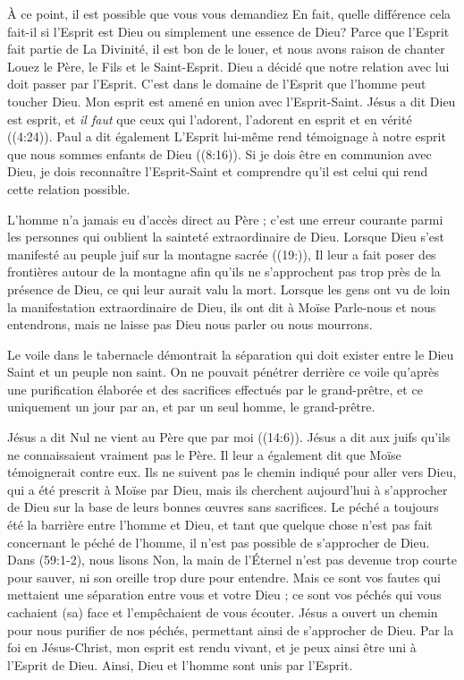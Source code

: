 À ce point, il est possible que vous vous demandiez\frcolon{}
 \Og En fait, quelle différence cela fait-il si l'Esprit est Dieu
 ou simplement une essence de Dieu? \Fg{}
 Parce que l'Esprit fait partie de La Divinité, il est bon de le louer,
 et nous avons raison de chanter\frcolon{}
 \Og Louez le Père, le Fils et le Saint-Esprit. \Fg{}
 Dieu a décidé que notre relation avec lui doit passer par
 l'Esprit. C'est dans le domaine de l'Esprit que l'homme peut toucher Dieu.
 Mon esprit est amené en union avec l'Esprit-Saint. Jésus a dit\frcolon{}
 \Og Dieu est esprit, et \emph{il faut} que ceux qui l'adorent, l'adorent en esprit
 et en vérité \Fg{} ((4:24)).
 Paul a dit également\frcolon{} \Og L'Esprit lui-même rend témoignage à notre esprit
 que nous sommes enfants de Dieu \Fg{} ((8:16)).
 Si je dois être en communion avec Dieu, je dois reconnaître l'Esprit-Saint
 et comprendre qu'il est celui qui rend cette relation possible.

L'homme n'a jamais eu d'accès direct au Père ; c'est une erreur courante parmi
 les personnes qui oublient la sainteté extraordinaire de Dieu.
 Lorsque Dieu s'est manifesté au peuple juif sur la montagne sacrée
 ((19:)), Il leur a fait poser des frontières autour de
 la montagne afin qu'ils ne s'approchent pas trop près de la présence
 de Dieu, ce qui leur aurait valu la mort.
 Lorsque les gens ont vu de loin la manifestation extraordinaire de Dieu,
 ils ont dit à Moïse\frcolon{}
 \Og Parle-nous et nous entendrons, mais ne laisse pas Dieu nous parler
 ou nous mourrons. \Fg{}

Le voile dans le tabernacle démontrait la séparation qui doit exister entre
 le Dieu Saint et un peuple non saint.
 On ne pouvait pénétrer derrière ce voile qu'après une purification élaborée
 et des sacrifices effectués par le grand-prêtre, et ce uniquement un jour par an,
 et par un seul homme, le grand-prêtre.

Jésus a dit\frcolon{} \Og Nul ne vient au Père que par moi \Fg{}
 ((14:6)).
 Jésus a dit aux juifs qu'ils ne connaissaient vraiment pas le Père.
 Il leur a également dit que Moïse témoignerait contre eux.
 Ils ne suivent pas le chemin indiqué pour aller vers Dieu, qui a été prescrit
 à Moïse par Dieu, mais ils cherchent aujourd'hui à s'approcher de Dieu
 sur la base de leurs bonnes œuvres sans sacrifices.
 Le péché a toujours été la barrière entre l'homme et Dieu, et tant
 que quelque chose n'est pas fait concernant le péché de l'homme,
 il n'est pas possible de s'approcher de Dieu.
 Dans (59:1-2), nous lisons\frcolon{}
 \Og Non, la main de l'Éternel n'est pas devenue trop courte pour sauver,
 ni son oreille trop dure pour entendre.
 Mais ce sont vos fautes qui mettaient une séparation entre vous et votre Dieu ;
 ce sont vos péchés qui vous cachaient (sa) face et l'empêchaient
 de vous écouter. \Fg{}
 Jésus a ouvert un chemin pour nous purifier de nos péchés,
 permettant ainsi de s'approcher de Dieu.
 Par la foi en Jésus-Christ, mon esprit est rendu vivant, et je peux ainsi
 être uni à l'Esprit de Dieu. Ainsi, Dieu et l'homme sont unis par l'Esprit.
\closechapter


